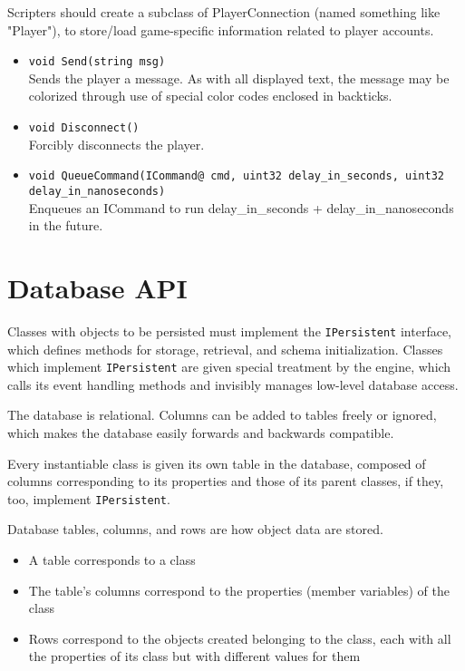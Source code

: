 \documentclass{book}
\begin{document}
Scripters should create a subclass of PlayerConnection (named something like
"Player"), to store/load game-specific information related to player accounts.

\begin{itemize}
\item \texttt{void Send(string msg)}\\ Sends the player a message. As with all
  displayed text, the message may be colorized through use of special color
  codes enclosed in backticks.

\item \texttt{void Disconnect()}\\
Forcibly disconnects the player.

\item \texttt{void QueueCommand(ICommand@ cmd, uint32 delay\_in\_seconds, uint32
  delay\_in\_nanoseconds)}\\ Enqueues an ICommand to run delay\_in\_seconds +
  delay\_in\_nanoseconds in the future.

\end{itemize}

\chapter{Database API}

Classes with objects to be persisted must implement the \texttt{IPersistent}
interface, which defines methods for storage, retrieval, and schema
initialization. Classes which implement \texttt{IPersistent} are given special
treatment by the engine, which calls its event handling methods and invisibly
manages low-level database access.

The database is relational. Columns can be added to tables freely or
ignored, which makes the database easily forwards and backwards compatible.

Every instantiable class is given its own table in the database, composed of
columns corresponding to its properties and those of its parent classes, if
they, too, implement \texttt{IPersistent}.

Database tables, columns, and rows are how object data are stored.
\begin{itemize}
\item A table corresponds to a class
\item The table's columns correspond to the properties (member variables) of the class
\item Rows correspond to the objects created belonging to the class, each with all the properties of
  its class but with different values for them
\end{itemize}
\end{document}
